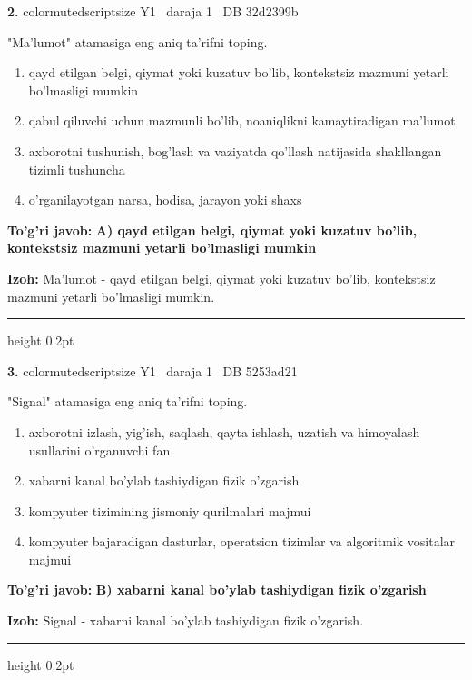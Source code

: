 \documentclass[10pt,a4paper,oneside]{article}
\begin{document}
\noindent\textbf{\color{ink}2.}  {color{muted}scriptsize Y1 \textbullet\ daraja 1 \textbullet\ DB 32d2399b}
\par
"Ma'lumot" atamasiga eng aniq ta'rifni toping.
\begin{enumerate}[label=\Alph*),leftmargin=9mm]
\item qayd etilgan belgi, qiymat yoki kuzatuv bo'lib, kontekstsiz mazmuni yetarli bo'lmasligi mumkin
\item qabul qiluvchi uchun mazmunli bo'lib, noaniqlikni kamaytiradigan ma'lumot
\item axborotni tushunish, bog'lash va vaziyatda qo'llash natijasida shakllangan tizimli tushuncha
\item o'rganilayotgan narsa, hodisa, jarayon yoki shaxs
\end{enumerate}
\begin{tcolorbox}[enhanced,breakable,colback=teal!4,colframe=teal!50!black,boxrule=0.5pt,arc=1.1mm,left=3mm,right=3mm,top=1.7mm,bottom=1.7mm,before skip=2mm,after skip=2mm]
\textbf{\color{teal}To'g'ri javob:} \textbf{A) qayd etilgan belgi, qiymat yoki kuzatuv bo'lib, kontekstsiz mazmuni yetarli bo'lmasligi mumkin}
\par\smallskip
\textbf{Izoh:} Ma'lumot - qayd etilgan belgi, qiymat yoki kuzatuv bo'lib, kontekstsiz mazmuni yetarli bo'lmasligi mumkin.
\end{tcolorbox}
\vspace{2mm}\hrule height 0.2pt \vspace{3mm}

\noindent\textbf{\color{ink}3.}  {color{muted}scriptsize Y1 \textbullet\ daraja 1 \textbullet\ DB 5253ad21}
\par
"Signal" atamasiga eng aniq ta'rifni toping.
\begin{enumerate}[label=\Alph*),leftmargin=9mm]
\item axborotni izlash, yig'ish, saqlash, qayta ishlash, uzatish va himoyalash usullarini o'rganuvchi fan
\item xabarni kanal bo'ylab tashiydigan fizik o'zgarish
\item kompyuter tizimining jismoniy qurilmalari majmui
\item kompyuter bajaradigan dasturlar, operatsion tizimlar va algoritmik vositalar majmui
\end{enumerate}
\begin{tcolorbox}[enhanced,breakable,colback=teal!4,colframe=teal!50!black,boxrule=0.5pt,arc=1.1mm,left=3mm,right=3mm,top=1.7mm,bottom=1.7mm,before skip=2mm,after skip=2mm]
\textbf{\color{teal}To'g'ri javob:} \textbf{B) xabarni kanal bo'ylab tashiydigan fizik o'zgarish}
\par\smallskip
\textbf{Izoh:} Signal - xabarni kanal bo'ylab tashiydigan fizik o'zgarish.
\end{tcolorbox}
\vspace{2mm}\hrule height 0.2pt \vspace{3mm}
\end{document}
